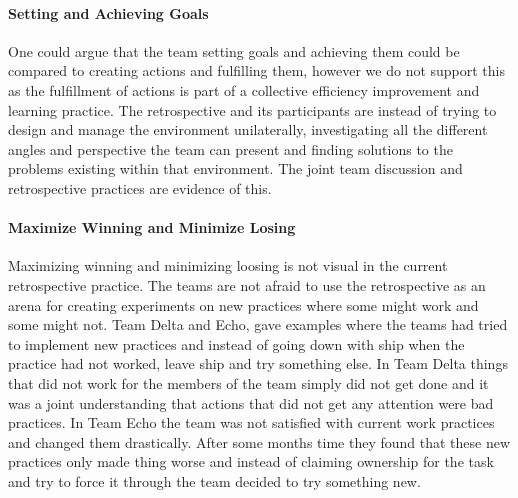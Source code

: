 \paragraph{Setting and  Achieving Goals}
One could argue that the team setting goals and achieving them could be compared to creating actions and fulfilling them, however we do not support this as the fulfillment of actions is part of a collective efficiency improvement and learning practice. The retrospective and its participants are instead of trying to design and manage the environment unilaterally, investigating all the different angles and perspective the team can present and finding solutions to the problems existing within that environment. The joint team discussion and retrospective practices are evidence of this. 

\paragraph{Maximize Winning and Minimize Losing}
Maximizing winning and minimizing loosing is not visual in the current retrospective practice. The teams are not afraid to use the retrospective as an arena for creating experiments on new practices where some might work and some might not. Team Delta and Echo, gave examples where the teams had tried to implement new practices and instead of going down with ship when the practice had not worked, leave ship and try something else. In Team Delta things that did not work for the members of the team simply did not get done and it was a joint understanding that actions that did not get any attention were bad practices. In Team Echo the team was not satisfied with current work practices and changed them drastically. After some months time they found that these new practices only made thing worse and instead of claiming ownership for the task and try to force it through the team decided to try something new. 

